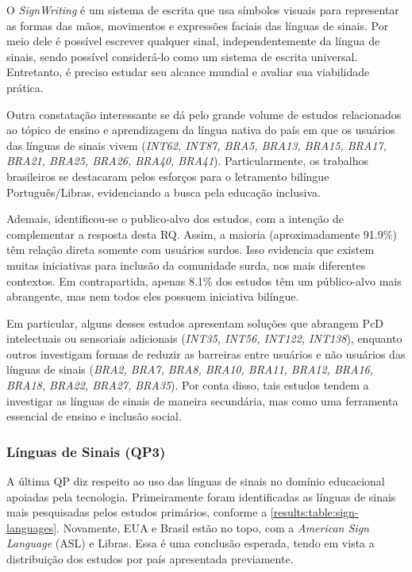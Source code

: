 O \textit{SignWriting} é um sistema de escrita que usa símbolos visuais para representar as formas das mãos, movimentos e expressões faciais das línguas de sinais. Por meio dele é possível escrever qualquer sinal, independentemente da língua de sinais, sendo possível considerá-lo como um sistema de escrita universal. Entretanto, é preciso estudar seu alcance mundial e avaliar sua viabilidade prática.

Outra constatação interessante se dá pelo grande volume de estudos relacionados ao tópico de ensino e aprendizagem da língua nativa do país em que os usuários das línguas de sinais vivem (\textit{INT62, INT87, BRA5, BRA13, BRA15, BRA17, BRA21, BRA25, BRA26, BRA40, BRA41}). Particularmente, os trabalhos brasileiros se destacaram pelos esforços para o letramento bilíngue Português/Libras, evidenciando a busca pela educação inclusiva.

Ademais, identificou-se o publico-alvo dos estudos, com a intenção de complementar a resposta desta RQ. Assim, a maioria (aproximadamente 91.9\%) têm relação direta somente com usuários surdos. Isso evidencia que existem muitas iniciativas para inclusão da comunidade surda, nos mais diferentes contextos. Em contrapartida, apenas 8.1\% dos estudos têm um público-alvo mais abrangente, mas nem todos eles possuem iniciativa bilíngue.

Em particular, alguns desses estudos apresentam soluções que abrangem PcD intelectuais ou sensoriais adicionais (\textit{INT35, INT56, INT122, INT138}), enquanto outros investigam formas de reduzir as barreiras entre usuários e não usuários das línguas de sinais (\textit{BRA2, BRA7, BRA8, BRA10, BRA11, BRA12, BRA16, BRA18, BRA22, BRA27, BRA35}). Por conta disso, tais estudos tendem a investigar as línguas de sinais de maneira secundária, mas como uma ferramenta essencial de ensino e inclusão social.

\subsubsection{Línguas de Sinais (QP3)}

A última QP diz respeito ao uso das línguas de sinais no domínio educacional apoiadas pela tecnologia. Primeiramente foram identificadas as línguas de sinais mais pesquisadas pelos estudos primários, conforme a \autoref{results:table:sign-languages}. Novamente, EUA e Brasil estão no topo, com a \textit{American Sign Language} (ASL) e Libras. Essa é uma conclusão esperada, tendo em vista a distribuição dos estudos por país apresentada previamente.

